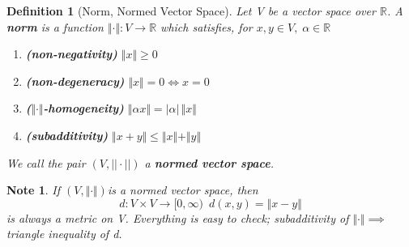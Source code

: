 \documentclass[11pt, oneside]{book}
\theoremstyle{break}
\newtheorem*{note}{Note}
\newtheorem{defn}{Definition}[section]
\newcommand{\bb}[1]{\mathbb{#1}}			%
\begin{document}
\begin{defn}[Norm, Normed Vector Space]
	Let V be a vector space over $\bb{R}$. A \textbf{norm} is a function $\Vert \cdot \Vert : V \to \bb{R}$ which satisfies, for $x, y \in V, \; \alpha \in \bb{R}$
	\begin{enumerate}
		\item \textbf{(non-negativity)} $\Vert x \Vert  \geq 0$
		\item \textbf{(non-degeneracy)} $\Vert x \Vert  = 0 \iff x = 0$
		\item \textbf{($\Vert \cdot\Vert $-homogeneity)} $\Vert \alpha x \Vert  = |\alpha| \, \Vert x \Vert $
		\item \textbf{(subadditivity)} $\Vert x + y \Vert  \leq \Vert x \Vert  + \Vert y \Vert $
	\end{enumerate}
	We call the pair $(V, ||\cdot||)$ a \textbf{normed vector space}.
\end{defn}

\begin{note}
	If $(V, \Vert \cdot\Vert )$is a normed vector space, then
	\begin{equation}
		d: V \times V \to [0, \infty) \enspace d(x,y) = \Vert x - y \Vert
	\end{equation}
	is always a metric on V. Everything is easy to check; subadditivity of $\Vert \cdot\Vert  \implies$ triangle inequality of d.
\end{note}
\end{document}
